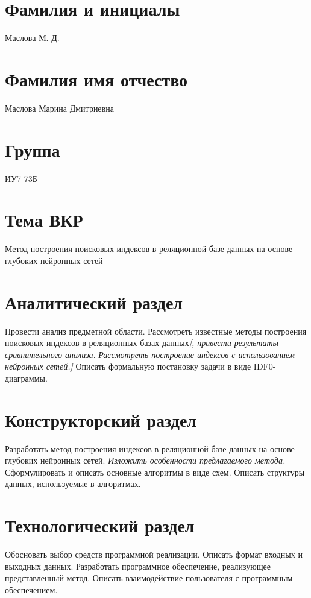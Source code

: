 \documentclass{bmstu}
\begin{document}
\section*{Фамилия и инициалы}

Маслова М. Д.

\section*{Фамилия имя отчество}

Маслова Марина Дмитриевна

\section*{Группа}

ИУ7-73Б

\section*{Тема ВКР}

Метод построения поисковых индексов в реляционной базе данных на основе глубоких
нейронных сетей

\section*{Аналитический раздел}

Провести анализ предметной области. Рассмотреть известные методы построения
поисковых индексов в реляционных базах данных\textit{[, привести результаты
сравнительного анализа}. \textit{Рассмотреть построение индексов с
использованием нейронных сетей.]} Описать формальную постановку задачи в виде
IDF0-диаграммы.

\section*{Конструкторский раздел}

Разработать метод построения индексов в реляционной базе данных на основе
глубоких нейронных сетей. \textit{Изложить особенности предлагаемого метода.}
Сформулировать и описать основные алгоритмы в виде схем. Описать структуры
данных, используемые в алгоритмах.

\section*{Технологический раздел}

Обосновать выбор средств программной реализации. Описать формат входных и
выходных данных. Разработать программное обеспечение, реализующее представленный
метод. Описать взаимодействие пользователя с программным обеспечением.
\end{document}
